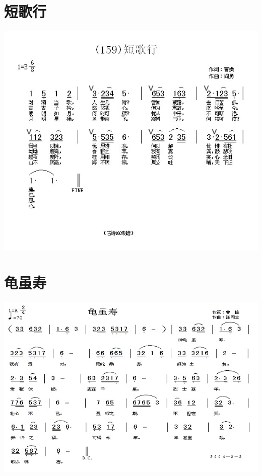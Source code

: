 \documentclass[cn,pad,twocol]{elegantbook}
\begin{document}
\section{短歌行}    \includegraphics[width=\textwidth]{dongxiao/20200808-短歌行-曹操.jpg} 
\section{龟虽寿}    \includegraphics[width=\textwidth]{dongxiao/20200808-神龟虽寿-曹操.jpg}
\end{document}
